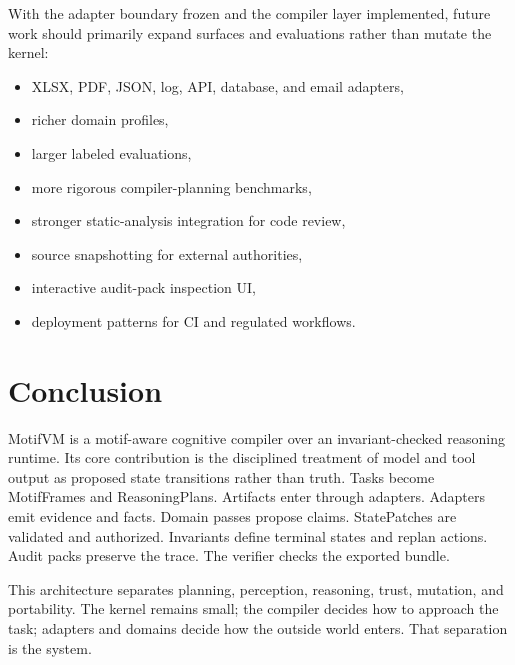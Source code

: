 \documentclass[11pt]{article}
\begin{document}
With the adapter boundary frozen and the compiler layer implemented, future work should primarily expand surfaces and evaluations rather than mutate the kernel:

\begin{itemize}[leftmargin=1.5em]
  \item XLSX, PDF, JSON, log, API, database, and email adapters,
  \item richer domain profiles,
  \item larger labeled evaluations,
  \item more rigorous compiler-planning benchmarks,
  \item stronger static-analysis integration for code review,
  \item source snapshotting for external authorities,
  \item interactive audit-pack inspection UI,
  \item deployment patterns for CI and regulated workflows.
\end{itemize}

\section{Conclusion}

MotifVM is a motif-aware cognitive compiler over an invariant-checked reasoning runtime. Its core contribution is the disciplined treatment of model and tool output as proposed state transitions rather than truth. Tasks become MotifFrames and ReasoningPlans. Artifacts enter through adapters. Adapters emit evidence and facts. Domain passes propose claims. StatePatches are validated and authorized. Invariants define terminal states and replan actions. Audit packs preserve the trace. The verifier checks the exported bundle.

This architecture separates planning, perception, reasoning, trust, mutation, and portability. The kernel remains small; the compiler decides how to approach the task; adapters and domains decide how the outside world enters. That separation is the system.
\end{document}
